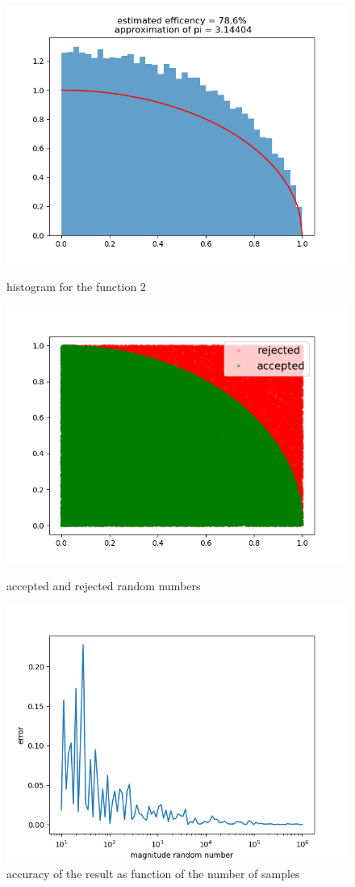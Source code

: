 \documentclass[11pt, a4paper, reqno]{scrartcl}
\begin{document}
     	\begin{figure}
        	\includegraphics[width=0.43\paperwidth]{pi.png}
            \caption{histogram for the function 2}
            \includegraphics[width=0.43\paperwidth]{accepted_rejected_pi.png}
            \caption{accepted and rejected random numbers}
            \includegraphics[width=0.43\paperwidth]{error_calculation_pi.png}
            \caption{accuracy of the result as function of the number of samples}
        \end{figure}
        
        
        
		        
\end{document}
